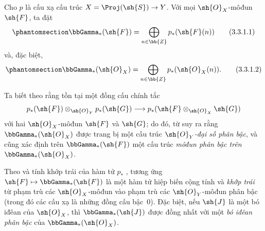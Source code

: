 \documentclass[oneside,10pt]{amsart}
\makeatletter
\newcommand{\ega@arrow}[2]{\mathchoice{#1}{#2}{#2}{#2}}
\let\ega@shortmapsto\mapsto
\renewcommand{\to}{\ega@arrow{\longrightarrow}{\rightarrow}}
\renewcommand{\mapsto}{\ega@arrow{\longmapsto}{\ega@shortmapsto}}
\newcommand{\oldpage}[2][]{\marginnote{\normalfont\footnotesize\textbf{#1}~|~#2}\ignorespaces}
\let\EGAOriginalLabel\label
\renewcommand{\label}[1]{\phantomsection\EGAOriginalLabel{#1}}
\makeatother
\begin{document}
\begin{env}[3.3.1]
\label{II.3.3.1}
Cho $p$ là cấu xạ cấu trúc $X=\Proj(\sh{S})\to Y$.
Với mọi $\sh{O}_X$-môđun $\sh{F}$, ta đặt
\[
\label{II.3.3.1.1}
  \bbGamma_*(\sh{F})=\bigoplus_{n\in\bb{Z}}p_*(\sh{F}(n))
\tag{3.3.1.1}
\]
\oldpage[II]{57}
và, đặc biệt,
\[
\label{II.3.3.1.2}
  \bbGamma_*(\sh{O}_X)=\bigoplus_{n\in\bb{Z}}p_*(\sh{O}_X(n)).
\tag{3.3.1.2}
\]

Ta biết theo  rằng tồn tại một đồng cấu chính tắc
\[
  p_*(\sh{F})\otimes_{\sh{O}_Y}p_*(\sh{G})\to p_*(\sh{F}\otimes_{\sh{O}_X}\sh{G})
\]
với hai $\sh{O}_X$-môđun $\sh{F}$ và $\sh{G}$;
do đó, từ  suy ra rằng $\bbGamma_*(\sh{O}_X)$ được trang bị một cấu trúc \emph{$\sh{O}_Y$-đại số phân bậc}, và  cũng xác định trên $\bbGamma_*(\sh{F})$ một cấu trúc \emph{môđun phân bậc trên $\bbGamma_*(\sh{O}_X)$}.

Theo  và tính khớp trái của hàm tử $p_*$ , tương ứng $\sh{F}\mapsto\bbGamma_*(\sh{F})$ là một hàm tử hiệp biến cộng tính và \emph{khớp trái} từ phạm trù các $\sh{O}_X$-môđun vào phạm trù các $\sh{O}_Y$-môđun phân bậc (trong đó các cấu xạ là những đồng cấu bậc~$0$).
Đặc biệt, nếu $\sh{J}$ là một bó iđêan của $\sh{O}_X$, thì $\bbGamma_*(\sh{J})$ được đồng nhất với một \emph{bó iđêan phân bậc} của $\bbGamma_*(\sh{O}_X)$.
\end{env}
\end{document}
